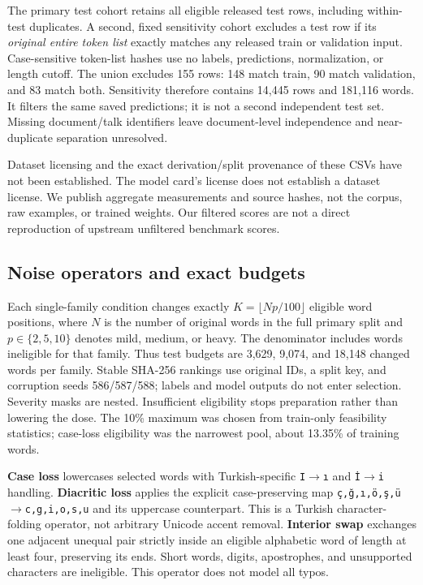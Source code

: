 \documentclass{article}
\begin{document}
The primary test cohort retains all eligible released test rows, including
within-test duplicates. A second, fixed sensitivity cohort excludes a test row
if its \emph{original entire token list} exactly matches any released train or
validation input. Case-sensitive token-list hashes use no labels, predictions,
normalization, or length cutoff. The union excludes 155 rows: 148 match train,
90 match validation, and 83 match both. Sensitivity therefore contains 14,445
rows and 181,116 words. It filters the same saved predictions; it is not a second
independent test set. Missing document/talk identifiers leave document-level
independence and near-duplicate separation unresolved.

Dataset licensing and the exact derivation/split provenance of these CSVs have
not been established. The model card's license does not establish a dataset
license. We publish aggregate measurements and source hashes, not the corpus,
raw examples, or trained weights. Our filtered scores are not a direct
reproduction of upstream unfiltered benchmark scores.

\subsection{Noise operators and exact budgets}
Each single-family condition changes exactly
$K=\lfloor Np/100\rfloor$ eligible word positions, where $N$ is the number of
original words in the full primary split and $p\in\{2,5,10\}$ denotes mild,
medium, or heavy. The denominator includes words ineligible for that family.
Thus test budgets are 3,629, 9,074, and 18,148 changed words per family. Stable
SHA-256 rankings use original IDs, a split key, and corruption seeds
586/587/588; labels and model outputs do not enter selection. Severity masks
are nested. Insufficient eligibility stops preparation rather than lowering
the dose. The 10\% maximum was chosen from train-only feasibility statistics;
case-loss eligibility was the narrowest pool, about 13.35\% of training words.

\textbf{Case loss} lowercases selected words with Turkish-specific
\texttt{I}$\rightarrow$\texttt{\i} and \texttt{\.{I}}$\rightarrow$\texttt{i}
handling. \textbf{Diacritic loss} applies the explicit case-preserving map
\texttt{\c{c},\u{g},\i,\"o,\c{s},\"u}$\rightarrow$\texttt{c,g,i,o,s,u}
and its uppercase counterpart. This is a Turkish character-folding operator,
not arbitrary Unicode accent removal. \textbf{Interior swap} exchanges one
adjacent unequal pair strictly inside an eligible alphabetic word of length
at least four, preserving its ends. Short words, digits, apostrophes, and
unsupported characters are ineligible. This operator does not model all typos.
\end{document}
